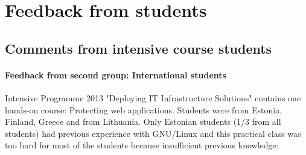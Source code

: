 \appendix
{}

\makeatletter
\renewcommand{\@makechapterhead}[1]{%
	\vspace*{0 pt}%
	{\color{chapters}\setlength{\parindent}{0pt} \raggedright \normalfont
	\bfseries\Huge{Appendix }
	\bfseries\Huge\thechapter\ --- #1
	\par\nobreak\vspace{0 pt}}}
\makeatother
{}
















\chapter{Feedback from students}
\section{Comments from intensive course students}



\subsubsection{Feedback from second group: International students}
Intensive Programme 2013 "Deploying IT Infrastructure Solutions" contains one hands-on course: Protecting web applications. Students were from Estonia, Finland, Greece and from Lithuania. 
Only Estonian students (1/3 from all students) had previous experience with GNU/Linux and this practical class was too hard for most of the students because insufficient previous knowledge:

